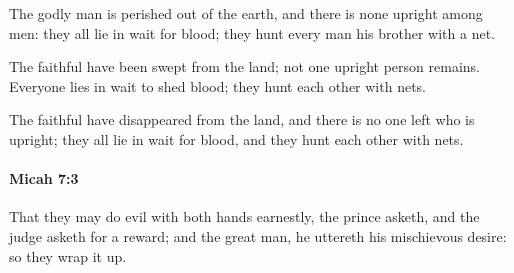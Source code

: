 			\begin{versebox}
					\item[BHS] 
					\item[LXX] 
					\item[ASV] The godly man is perished out of the earth, and there is none upright among men: they all lie in wait for blood; they hunt every man his brother with a net.
					\item[NIV] The faithful have been swept from the land; not one upright person remains. Everyone lies in wait to shed blood; they hunt each other with nets.
					\item[NRSV] The faithful have disappeared from the land, and there is no one left who is upright; they all lie in wait for blood, and they hunt each other with nets.
			\end{versebox}

		\paragraph{Micah 7:3} %
			\label{MICAH-7-3}

			That they may do evil with both hands earnestly, the prince asketh, and the judge asketh for a reward; and the great man, he uttereth his mischievous desire: so they wrap it up.

